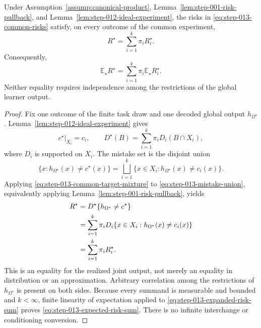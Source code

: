 \begin{lemma}
\label{lem:step-013-exact-risk-sum}
Under Assumption~\ref{assump:canonical-product},
Lemma~\ref{lem:step-001-risk-pullback}, and
Lemma~\ref{lem:step-012-ideal-experiment}, the risks in
\eqref{eq:step-013-common-risks} satisfy, on every outcome of the common
experiment,
\begin{equation}\label{eq:step-013-pointwise-risk-sum}
R^\star=\sum_{i=1}^k\pi_iR_i^\star.
\end{equation}
Consequently,
\begin{equation}\label{eq:step-013-expected-risk-sum}
\mathbb E_\star R^\star
=\sum_{i=1}^k\pi_i\mathbb E_\star R_i^\star.
\end{equation}
Neither equality requires independence among the restrictions of the
global learner output.
\end{lemma}

\begin{proof}
Fix one outcome of the finite task draw and one decoded global output
\(h_{\Omega^\star}\).  Lemma~\ref{lem:step-012-ideal-experiment} gives
\begin{equation}\label{eq:step-013-common-target-mixture}
c^\star|_{X_i}=c_i,
\qquad
D^\star(B)=\sum_{i=1}^k\pi_iD_i(B\cap X_i),
\end{equation}
where \(D_i\) is supported on \(X_i\).  The mistake set is the disjoint
union
\begin{equation}\label{eq:step-013-mistake-union}
\{x:h_{\Omega^\star}(x)\ne c^\star(x)\}
=\bigsqcup_{i=1}^k
\{x\in X_i:h_{\Omega^\star}(x)\ne c_i(x)\}.
\end{equation}
Applying \eqref{eq:step-013-common-target-mixture} to
\eqref{eq:step-013-mistake-union}, equivalently applying
Lemma~\ref{lem:step-001-risk-pullback}, yields
\begin{align}
R^\star
&=D^\star\{h_{\Omega^\star}\ne c^\star\}\notag\\
&=\sum_{i=1}^k\pi_i
  D_i\{x\in X_i:h_{\Omega^\star}(x)\ne c_i(x)\}\notag\\
&=\sum_{i=1}^k\pi_iR_i^\star.
\label{eq:step-013-expanded-risk-sum}
\end{align}
This is an equality for the realized joint output, not merely an
equality in distribution or an approximation.  Arbitrary correlation
among the restrictions of \(h_{\Omega^\star}\) is present on both
sides.  Because every summand is measurable and bounded and \(k<\infty\),
finite linearity of expectation applied to
\eqref{eq:step-013-expanded-risk-sum} proves
\eqref{eq:step-013-expected-risk-sum}.  There is no infinite
interchange or conditioning conversion.
\end{proof}

